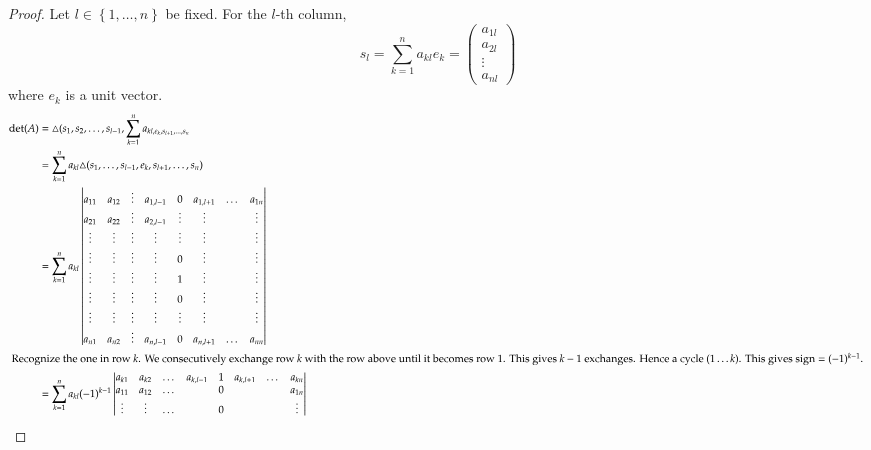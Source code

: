 \documentclass{article}
\newcommand{\set}[1]{\left\{#1\right\}}
\DeclareMathOperator{\sign}{sign}
\begin{document}
\begin{proof}
  Let $l \in \set{1, \dots, n}$ be fixed.
  For the $l$-th column,
  \[ s_l = \sum_{k=1}^n a_{kl} e_k = \begin{pmatrix} a_{1l} \\ a_{2l} \\ \vdots \\ a_{nl} \end{pmatrix} \]
  where $e_k$ is a unit vector.
  \begin{align*}
    \det(A) &= \triangle(s_1, s_2, \dots, s_{l-1}, \sum_{k=1}^n a_{kl, e_k, s_{l+1}, \dots, s_n} \\
            &= \sum_{k=1}^n a_{kl} \triangle(s_1, \dots, s_{l-1}, e_k, s_{l+1}, \dots, s_n) \\
            &= \sum_{k=1}^n a_{kl} \begin{vmatrix}
              a_{11} & a_{12} & \vdots & a_{1,l-1} & 0 & a_{1,l+1} & \dots & a_{1n} \\
              a_{21} & a_{22} & \vdots & a_{2,l-1} & \vdots & \vdots &  & \vdots \\
              \vdots & \vdots & \vdots & \vdots & \vdots & \vdots &  & \vdots \\
              \vdots & \vdots & \vdots & \vdots & 0 & \vdots &  & \vdots \\
              \vdots & \vdots & \vdots & \vdots & 1 & \vdots &  & \vdots \\
              \vdots & \vdots & \vdots & \vdots & 0 & \vdots &  & \vdots \\
              \vdots & \vdots & \vdots & \vdots & \vdots & \vdots &  & \vdots \\
              a_{n1} & a_{n2} & \vdots & a_{n,l-1} & 0 & a_{n,l+1} & \dots & a_{nn} \\
            \end{vmatrix} \\
    \intertext{
      Recognize the one in row $k$. We consecutively exchange row $k$ with the row above until it becomes row 1.
      This gives $k-1$ exchanges. Hence a cycle $(1 \dots k)$. This gives $\sign = (-1)^{k-1}$.
    }
    &= \sum_{k=1}^n a_{kl} (-1)^{k-1} \begin{vmatrix}
      a_{k1} & a_{k2} & \dots & a_{k,l-1} & 1 & a_{k,l+1} & \dots & a_{kn} \\
      a_{11} & a_{12} & \dots &           & 0 &           &       & a_{1n} \\
      \vdots & \vdots & \dots &           & 0 &           &       & \vdots \\

\end{vmatrix}
\end{align*}
\end{proof}
\end{document}
